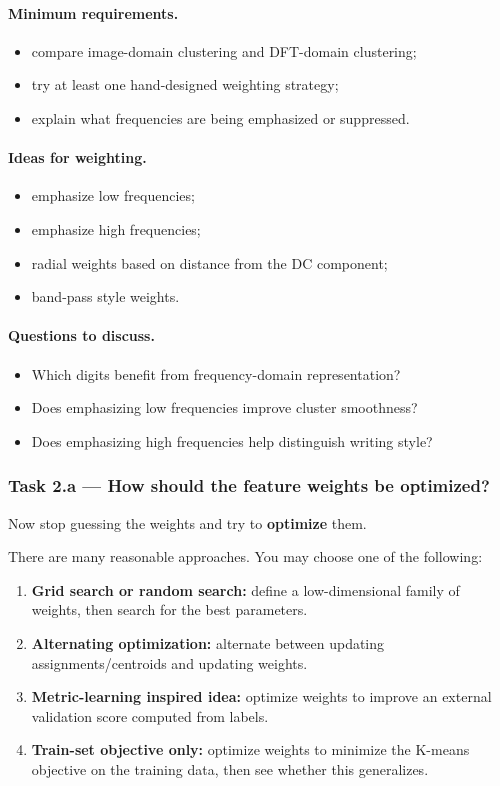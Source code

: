 \documentclass[11pt]{article}
\begin{document}
\paragraph{Minimum requirements.}
\begin{itemize}[itemsep=2pt]
    \item compare image-domain clustering and DFT-domain clustering;
    \item try at least one hand-designed weighting strategy;
    \item explain what frequencies are being emphasized or suppressed.
\end{itemize}

\paragraph{Ideas for weighting.}
\begin{itemize}[itemsep=2pt]
    \item emphasize low frequencies;
    \item emphasize high frequencies;
    \item radial weights based on distance from the DC component;
    \item band-pass style weights.
\end{itemize}

\paragraph{Questions to discuss.}
\begin{itemize}[itemsep=2pt]
    \item Which digits benefit from frequency-domain representation?
    \item Does emphasizing low frequencies improve cluster smoothness?
    \item Does emphasizing high frequencies help distinguish writing style?
\end{itemize}

\subsubsection*{Task 2.a --- How should the feature weights be optimized?}

Now stop guessing the weights and try to \textbf{optimize} them.

There are many reasonable approaches. You may choose one of the following:
\begin{enumerate}[itemsep=2pt]
    \item \textbf{Grid search or random search:} define a low-dimensional family of weights, then search for the best parameters.
    \item \textbf{Alternating optimization:} alternate between updating assignments/centroids and updating weights.
    \item \textbf{Metric-learning inspired idea:} optimize weights to improve an external validation score computed from labels.
    \item \textbf{Train-set objective only:} optimize weights to minimize the K-means objective on the training data, then see whether this generalizes.
\end{enumerate}
\end{document}
